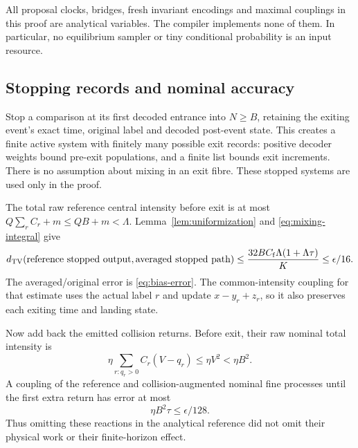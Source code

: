 \documentclass[11pt,reqno]{amsart}
\theoremstyle{definition}
\theoremstyle{remark}
\newcommand{\TV}{d_{\mathrm{TV}}}
\begin{document}
All proposal clocks, bridges, fresh invariant encodings and maximal couplings
in this proof are analytical variables. The compiler implements none of them.
In particular, no equilibrium sampler or tiny conditional probability is an
input resource.

\subsection{Stopping records and nominal accuracy}
Stop a comparison at its first decoded entrance into $N\ge B$, retaining the
exiting event's exact time, original label and decoded post-event state.
This creates a finite active system with finitely many possible exit records:
positive decoder weights bound pre-exit populations, and a finite list bounds
exit increments. There is no assumption about mixing in an exit fibre.
These stopped systems are used only in the proof.

The total raw reference central intensity before exit is at most
$Q\sum_r C_r+m\le QB+m<\Lambda$. Lemma~\ref{lem:uniformization} and
\eqref{eq:mixing-integral} give
\begin{equation}\label{eq:averaging-error}
 \TV(\text{reference stopped output},\text{averaged stopped path})
 \le\frac{32BC_{\rm f}\Lambda(1+\Lambda\tau)}K
 \le\epsilon/16.
\end{equation}
The averaged/original error is \eqref{eq:bias-error}. The common-intensity
coupling for that estimate uses the actual label $r$ and update
$x-y_r+z_r$, so it also preserves each exiting time and landing state.

Now add back the emitted collision returns. Before exit, their raw nominal
total intensity is
\[
 \eta\sum_{r:q_r>0}C_r(V-q_r)\le\eta V^2<\eta B^2.
\]
A coupling of the reference and collision-augmented nominal fine processes
until the first extra return has error at most
\begin{equation}\label{eq:collision-error}
 \eta B^2\tau\le\epsilon/128.
\end{equation}
Thus omitting these reactions in the analytical reference did not omit their
physical work or their finite-horizon effect.
\end{document}
